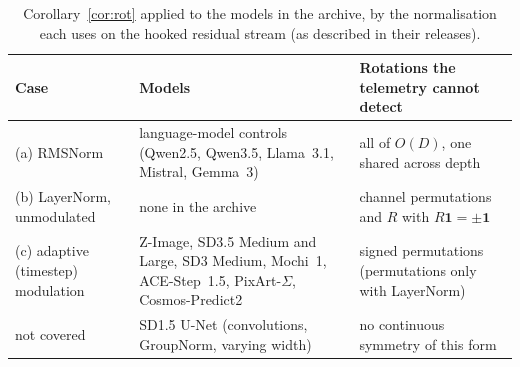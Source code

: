 \documentclass[11pt]{article}
\theoremstyle{definition}
\begin{document}
\begin{table}[h]
\centering\small
\caption{Corollary~\ref{cor:rot} applied to the models in the archive, by the normalisation each uses on the hooked residual stream (as described in their releases).}
\label{tab:symclass}
\begin{tabularx}{\linewidth}{@{}lLL@{}}
\toprule
Case & Models & Rotations the telemetry cannot detect\\
\midrule
(a) RMSNorm & language-model controls (Qwen2.5, Qwen3.5, Llama~3.1, Mistral, Gemma~3) & all of $O(D)$, one shared across depth\\
(b) LayerNorm, unmodulated & none in the archive & channel permutations and $R$ with $R\mathbf 1=\pm\mathbf 1$\\
(c) adaptive (timestep) modulation & Z-Image, SD3.5 Medium and Large, SD3 Medium, Mochi~1, ACE-Step~1.5, PixArt-$\Sigma$, Cosmos-Predict2 & signed permutations (permutations only with LayerNorm)\\
not covered & SD1.5 U-Net (convolutions, GroupNorm, varying width) & no continuous symmetry of this form\\
\bottomrule
\end{tabularx}
\end{table}
\end{document}
